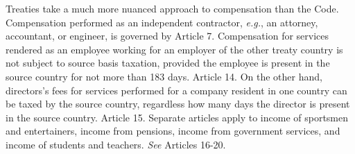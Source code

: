 Treaties take a much more nuanced approach to compensation than the Code.  Compensation performed as an independent contractor, \emph{e.g.}, an attorney, accountant, or engineer, is governed by Article 7.  Compensation for services rendered as an employee working for an employer of the other treaty country is not subject to source basis taxation, provided the employee is present in the source country for not more than 183 days.  Article 14.  On the other hand, directors's fees for services performed for a company resident in one country can be taxed by the source country, regardless how many days the director is present in the source country.  Article 15.  Separate articles apply to income of sportsmen and entertainers, income from pensions, income from government services, and income of students and teachers.  \emph{See} Articles 16-20.    

